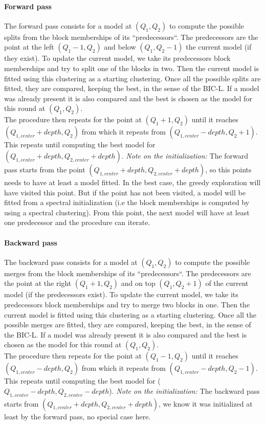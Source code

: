\documentclass[12pt,a4paper]{report}
\begin{document}
\paragraph*{Forward pass} The forward pass consists for a model at $(Q_1, Q_2)$
to compute the possible splits from the block memberships of its ``predecessors``.
The predecessors are the point at the left $(Q_1 - 1, Q_2)$ and below
$(Q_1, Q_2 - 1)$ the current model (if they exist). To update the current model,
we take its predecessors block memberships and try to split one of the blocks in
two. Then the current model is fitted using this clustering as a starting
clustering. Once all the possible splits are fitted, they are compared, keeping
the best, in the sense of the BIC-L. If a model was already present it is also
compared and the best is chosen as the model for this round at $(Q_1, Q_2)$.\\
The procedure then repeats for the point at $(Q_1 + 1, Q_2)$ until it reaches
$(Q_{1,center} + depth, Q_2)$ from which it repeats from
$(Q_{1,center} - depth, Q_2 + 1)$. This repeats until computing the best model
for $(Q_{1,center} + depth, Q_{2,center} + depth)$.
\textit{Note on the initialization:} The forward pass starts from the point
$(Q_{1,center} + depth, Q_{2,center} + depth)$, so this points needs to have at
least a model fitted. In the best case, the greedy exploration will have visited
this point. But if the point has not been visited, a model will be fitted from
a spectral initialization (i.e the block memberships is computed by using a
spectral clustering). From this point, the next model will have at least one
predecessor and the procedure can iterate.

\paragraph*{Backward pass} The backward pass consists for a model at $(Q_1, Q_2)$
to compute the possible merges from the block memberships of its ``predecessors``.
The predecessors are the point at the right $(Q_1 + 1, Q_2)$ and on top
$(Q_1, Q_2 + 1)$ of the current model (if the predecessors exist). To update the
current model, we take its predecessors block memberships and try to merge two
blocks in one. Then the current model is fitted using this clustering as
a starting clustering. Once all the possible merges are fitted, they are
compared, keeping the best, in the sense of the BIC-L.
If a model was already present it is also
compared and the best is chosen as the model for this round at $(Q_1, Q_2)$.\\
The procedure then repeats for the point at $(Q_1 - 1, Q_2)$ until it reaches
$(Q_{1,center} - depth, Q_2)$ from which it repeats from
$(Q_{1,center} - depth, Q_2 - 1)$. This repeats until computing the best model
for ($Q_{1,center} - depth, Q_{2,center} - depth$).
\textit{Note on the initialization:} The backward pass starts from
$(Q_{1,center} + depth, Q_{2,center} + depth)$, we know it was initialized at
least by the forward pass, no special case here.\\
\end{document}
